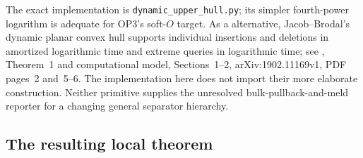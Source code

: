 The exact implementation is \texttt{dynamic\_upper\_hull.py}; its simpler
fourth-power logarithm is adequate for OP3's soft-$O$ target. As a
\statussource{} alternative, Jacob--Brodal's dynamic planar convex hull
supports individual insertions and deletions in amortized logarithmic time
and extreme queries in logarithmic time; see \citet{jacob2019dynamic}, Theorem~1 and
computational model, Sections~1--2, arXiv:1902.11169v1, PDF pages~2 and~5--6.
The implementation here does not import their more elaborate construction.
Neither primitive supplies the unresolved bulk-pullback-and-meld reporter
for a changing general separator hierarchy.

\subsection{The resulting local theorem}

